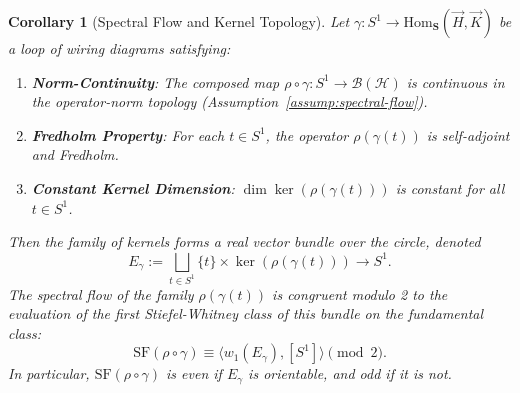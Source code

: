 \documentclass[11pt]{article}
\newtheorem{corollary}{Corollary}
\begin{document}
\begin{corollary}[Spectral Flow and Kernel Topology]\label{cor:spectral-flow-invariants}
Let $\gamma: S^1 \to \mathrm{Hom}_{\mathbf{S}}(\vec{H}, \vec{K})$ be a loop of wiring diagrams satisfying:

\begin{enumerate}
    \item[(A1)] \textbf{Norm-Continuity}: The composed map $\rho \circ \gamma: S^1 \to \mathcal{B}(\mathcal{H})$ is continuous in the operator-norm topology (Assumption~\ref{assump:spectral-flow}).
    \item[(A2)] \textbf{Fredholm Property}: For each $t \in S^1$, the operator $\rho(\gamma(t))$ is self-adjoint and Fredholm.
    \item[(A3)] \textbf{Constant Kernel Dimension}: $\dim \ker(\rho(\gamma(t)))$ is constant for all $t \in S^1$.
\end{enumerate}

Then the family of kernels forms a real vector bundle over the circle, denoted
\[
E_\gamma := \bigsqcup_{t \in S^1} \{t\} \times \ker(\rho(\gamma(t))) \rightarrow S^1.
\]
The spectral flow of the family $\rho(\gamma(t))$ is congruent modulo 2 to the evaluation of the first Stiefel-Whitney class of this bundle on the fundamental class:
\[
\mathrm{SF}(\rho \circ \gamma) \equiv \langle w_1(E_\gamma), [S^1] \rangle \pmod{2}.
\]
In particular, $\mathrm{SF}(\rho \circ \gamma)$ is even if $E_\gamma$ is orientable, and odd if it is not.
\end{corollary}
\end{document}
